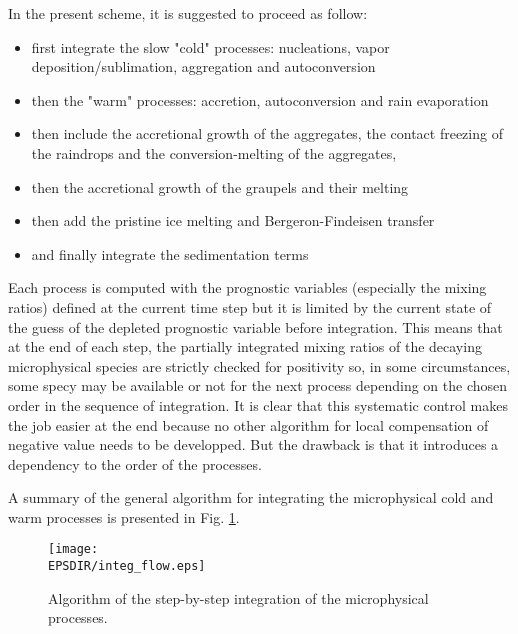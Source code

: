 In the present scheme, it is suggested to proceed as follow:

\begin{itemize}
\item first integrate the slow "cold" processes: nucleations, vapor
deposition/sublimation, aggregation and autoconversion
\item then the "warm" processes: accretion, autoconversion and
rain evaporation
\item then include the accretional growth of the aggregates, the contact
freezing of the raindrops and the conversion-melting of the aggregates,
\item then the accretional growth of the graupels and their melting
\item then add the pristine ice melting and Bergeron-Findeisen transfer
\item and finally integrate the sedimentation terms
\end{itemize}

\noindent Each process is computed with the prognostic variables (especially
the mixing ratios) defined at the current time step but it is limited by
the current state of the guess of the depleted prognostic variable before
integration. This means that at the end of each step, the partially integrated
mixing ratios of the decaying microphysical species are strictly checked for
positivity so, in some circumstances, some specy may be available or not for
the next process depending on the chosen order in the sequence of integration.
It is clear that this systematic control makes the job easier at the end
because no other algorithm for local compensation of negative value needs to
be developped. But the drawback is that it introduces a dependency to the order of the processes.

A summary of the general algorithm for integrating the microphysical cold and
warm processes is presented in Fig. \ref{mixfigalgo}.

\begin{figure}[!ht]
\centerline{\texttt{[image: \\EPSDIR/integ\_flow.eps]}}
\caption{Algorithm of the step-by-step integration of the microphysical processes.}
\label{mixfigalgo}
\end{figure}

%
